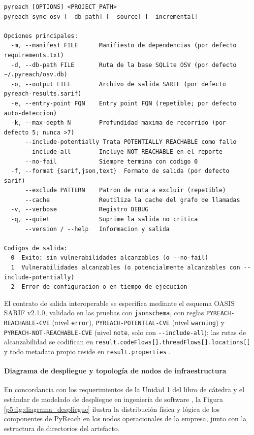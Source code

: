 \begin{lstlisting}[caption={Contrato de interfaz de línea de comandos de PyReach}, label={lst:cli_contract}]
pyreach [OPTIONS] <PROJECT_PATH>
pyreach sync-osv [--db-path] [--source] [--incremental]

Opciones principales:
  -m, --manifest FILE      Manifiesto de dependencias (por defecto requirements.txt)
  -d, --db-path FILE       Ruta de la base SQLite OSV (por defecto ~/.pyreach/osv.db)
  -o, --output FILE        Archivo de salida SARIF (por defecto pyreach-results.sarif)
  -e, --entry-point FQN    Entry point FQN (repetible; por defecto auto-deteccion)
  -k, --max-depth N        Profundidad maxima de recorrido (por defecto 5; nunca >7)
      --include-potentially Trata POTENTIALLY_REACHABLE como fallo
      --include-all        Incluye NOT_REACHABLE en el reporte
      --no-fail            Siempre termina con codigo 0
  -f, --format {sarif,json,text}  Formato de salida (por defecto sarif)
      --exclude PATTERN    Patron de ruta a excluir (repetible)
      --cache              Reutiliza la cache del grafo de llamadas
  -v, --verbose            Registro DEBUG
  -q, --quiet              Suprime la salida no critica
      --version / --help   Informacion y salida

Codigos de salida:
  0  Exito: sin vulnerabilidades alcanzables (o --no-fail)
  1  Vulnerabilidades alcanzables (o potencialmente alcanzables con --include-potentially)
  2  Error de configuracion o en tiempo de ejecucion
\end{lstlisting}

El contrato de salida interoperable se especifica mediante el esquema OASIS SARIF v2.1.0, validado en las pruebas con \texttt{jsonschema}, con reglas \texttt{PYREACH-\allowbreak REACHABLE-\allowbreak CVE} (nivel \texttt{error}), \texttt{PYREACH-\allowbreak POTENTIAL-\allowbreak CVE} (nivel \texttt{warning}) y \texttt{PYREACH-\allowbreak NOT-\allowbreak REACHABLE-\allowbreak CVE} (nivel \texttt{note}, solo con \texttt{-\allowbreak -\allowbreak include-\allowbreak all}); las rutas de alcanzabilidad se codifican en \texttt{result.\allowbreak codeFlows[].\allowbreak threadFlows[].\allowbreak locations[]} y todo metadato propio reside en \texttt{result.\allowbreak properties} \cite{oasis2019sarif}.

\paragraph*{Diagrama de despliegue y topología de nodos de infraestructura}
En concordancia con los requerimientos de la Unidad 1 del libro de cátedra \cite{torres2026proyecto} y el estándar de modelado de despliegue en ingeniería de software \cite{pressman2020software, sommerville2016software}, la Figura \ref{p5:fig:diagrama_despliegue} ilustra la distribución física y lógica de los componentes de PyReach en los nodos operacionales de la empresa, junto con la estructura de directorios del artefacto.

